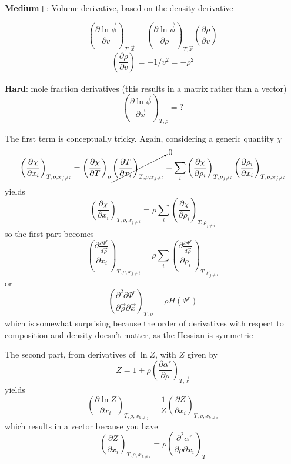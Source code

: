\documentclass{article}
\newcommand{\deriv}[3]{\ensuremath{\left(\frac{\partial #1}{\partial #2}\right)_{#3}}}
\begin{document}
\textbf{Medium+}: Volume derivative, based on the density derivative

\begin{equation}
\deriv{ \ln\vec\phi}{v}{T,\vec x} = \deriv{ \ln\vec\phi}{\rho}{T,\vec x}\deriv{ \rho}{v}{}
\end{equation}
\begin{equation}
\deriv{\rho}{v}{} = -1/v^2 = -\rho^2
\end{equation}

\textbf{Hard}: mole fraction derivatives (this results in a matrix rather than a vector)
\begin{equation}
	\deriv{ \ln\vec\phi}{\vec x}{T,\rho} = ?
\end{equation}

The first term is conceptually tricky. Again, considering a generic quantity $\chi$
\begin{equation}
	\deriv{\chi}{x_i}{T, \rho,  x_{j\neq i}} = \deriv{\chi}{T}{\vec \rho}\cancelto{0}{\deriv{T}{x_i}{T,\rho,x_{j\neq i}}} + \sum_i\deriv{\chi}{\rho_i}{T, \rho_{j\neq i}}\deriv{\rho_i}{x_i}{T,\rho, x_{j\neq i}}
\end{equation}
yields
\begin{equation}
	\deriv{\chi}{x_i}{T, \rho,  x_{j\neq i}} = \rho \sum_i\deriv{\chi}{\rho_i}{T, \rho_{j\neq i}}
\end{equation}
so the first part becomes
\begin{equation}
	\deriv{\frac{\partial \Psi^r}{d\vec\rho}}{x_i}{T, \rho,  x_{j\neq i}} = \rho \sum_i\deriv{\frac{\partial \Psi^r}{d\vec\rho}}{\rho_i}{T, \rho_{j\neq i}}
\end{equation}
or
\begin{equation}
	\deriv{^2\partial \Psi^r}{\vec\rho \partial \vec x}{T, \rho} = \rho H(\Psi^r)
\end{equation} 
which is somewhat surprising because the order of derivatives with respect to composition and density doesn't matter, as the Hessian is symmetric

The second part, from derivatives of $\ln Z$, with $Z$ given by
\begin{equation}
	Z = 1+\rho\deriv{\alpha^r}{\rho}{T, \vec x}
\end{equation}
yields
\begin{equation}
\deriv{\ln Z}{x_i}{T,\rho,x_{k \neq j}} = \frac{1}{Z}\deriv{Z}{x_i}{T,\rho,x_{k \neq i}}
\end{equation}
which results in a vector because you have 
\begin{equation}
\deriv{Z}{x_i}{T,\rho,x_{k \neq i}} = \rho \deriv{^2\alpha^r}{\rho\partial x_i}{T}
\end{equation}
\end{document}
